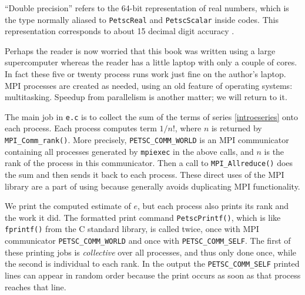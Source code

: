 ``Double precision'' refers to the 64-bit representation of real numbers, which is the type normally aliased to \texttt{PetscReal} and \texttt{PetscScalar} inside \PETSc codes.  This representation corresponds to about 15 decimal digit accuracy \citep{TrefethenBau}.


Perhaps the reader is now worried that this book was written using a large supercomputer whereas the reader has a little laptop with only a couple of cores.  In fact these five or twenty process runs work just fine on the author's laptop.  MPI processes are created as needed, using an old feature of operating systems: multitasking.  Speedup from parallelism is another matter; we will return to it.

The main job in \texttt{e.c} is to collect the sum of the terms of series \eqref{introeseries} onto each process.  Each process computes term $1/n!$, where $n$ is returned by \texttt{MPI\_Comm\_rank()}.  More precisely, \texttt{PETSC\_COMM\_WORLD} is an MPI communicator \citep{Groppetal1999} containing all processes generated by \texttt{mpiexec} in the above calls, and $n$ is the rank of the process in this communicator.  Then a call to \texttt{MPI\_Allreduce()} does the sum and then sends it back to each process.  These direct uses of the MPI library are a part of using \PETSc because \PETSc generally avoids duplicating MPI functionality.

We print the computed estimate of $e$, but each process also prints its rank and the work it did.  The formatted print command \texttt{PetscPrintf()}, which is like \texttt{fprintf()} from the C standard library, is called twice, once with MPI communicator \texttt{PETSC\_COMM\_WORLD} and once with \texttt{PETSC\_COMM\_SELF}.  The first of these printing jobs is \emph{collective} over all processes, and thus only done once, while the second is individual to each rank.  In the output the \texttt{PETSC\_COMM\_SELF} printed lines can appear in random order because the print occurs as soon as that process reaches that line.

